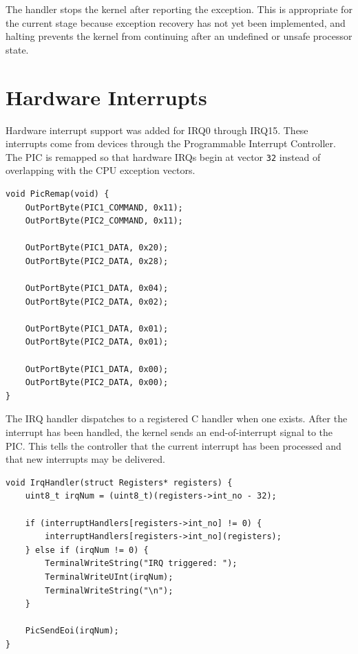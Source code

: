 The handler stops the kernel after reporting the exception. This is appropriate for the current stage because exception recovery has not yet been implemented, and halting prevents the kernel from continuing after an undefined or unsafe processor state.

\section{Hardware Interrupts}

Hardware interrupt support was added for IRQ0 through IRQ15. These interrupts come from devices through the Programmable Interrupt Controller. The PIC is remapped so that hardware IRQs begin at vector \texttt{32} instead of overlapping with the CPU exception vectors.

\begin{listing}[H]
\begin{verbatim}
void PicRemap(void) {
    OutPortByte(PIC1_COMMAND, 0x11);
    OutPortByte(PIC2_COMMAND, 0x11);

    OutPortByte(PIC1_DATA, 0x20);
    OutPortByte(PIC2_DATA, 0x28);

    OutPortByte(PIC1_DATA, 0x04);
    OutPortByte(PIC2_DATA, 0x02);

    OutPortByte(PIC1_DATA, 0x01);
    OutPortByte(PIC2_DATA, 0x01);

    OutPortByte(PIC1_DATA, 0x00);
    OutPortByte(PIC2_DATA, 0x00);
}
\end{verbatim}
\caption{Remapping the PIC so IRQs use interrupt vectors \texttt{32} through \texttt{47}.}
\end{listing}

The IRQ handler dispatches to a registered C handler when one exists. After the interrupt has been handled, the kernel sends an end-of-interrupt signal to the PIC. This tells the controller that the current interrupt has been processed and that new interrupts may be delivered.

\begin{listing}[H]
\begin{verbatim}
void IrqHandler(struct Registers* registers) {
    uint8_t irqNum = (uint8_t)(registers->int_no - 32);

    if (interruptHandlers[registers->int_no] != 0) {
        interruptHandlers[registers->int_no](registers);
    } else if (irqNum != 0) {
        TerminalWriteString("IRQ triggered: ");
        TerminalWriteUInt(irqNum);
        TerminalWriteString("\n");
    }

    PicSendEoi(irqNum);
}
\end{verbatim}
\caption{Dispatching hardware interrupts and acknowledging them with the PIC.}
\end{listing}
\clearpage

